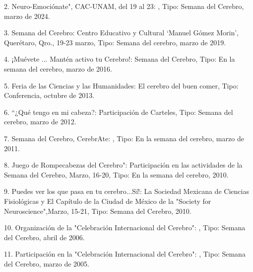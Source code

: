 \documentclass[12pt]{article}
\begin{document}
2. Neuro-Emociónate", CAC-UNAM, del 19 al 23: , Tipo: Semana del Cerebro, marzo de 2024.

3. Semana del Cerebro: Centro Educativo y Cultural ‘Manuel Gómez Morin’, Querétaro, Qro., 19-23 marzo, Tipo: Semana del cerebro, marzo 
de 2019.

4. ¡Muévete ... Mantén activo tu Cerebro!: Semana del Cerebro, Tipo: En la semana del cerebro, marzo de 2016.

5. Feria de las Ciencias y las Humanidades: El cerebro del buen comer, Tipo: Conferencia, octubre de 2013.

6. “¿Qué tengo en mi cabeza?: Participación de Carteles, Tipo: Semana del cerebro, marzo de 2012.

7. Semana del Cerebro, CerebrAte: , Tipo: En la semana del cerebro, marzo de 2011.

8. Juego de Rompecabezas del Cerebro": Participación en las actividades de la Semana del Cerebro, Marzo, 16-20, Tipo: En la semana del 
cerebro, 2010.

9. Puedes ver los que pasa en tu cerebro...Sí!: La Sociedad Mexicana de Ciencias Fisiológicas y El Capítulo de la Ciudad de México de 
la "Society for Neuroscience",Marzo, 15-21, Tipo: Semana del Cerebro, 2010.

10. Organización de la "Celebración Internacional del Cerebro": , Tipo: Semana del Cerebro, abril de 2006.

11. Participación en la "Celebración Internacional del Cerebro": , Tipo: Semana del Cerebro, marzo de 2005.
\end{document}
